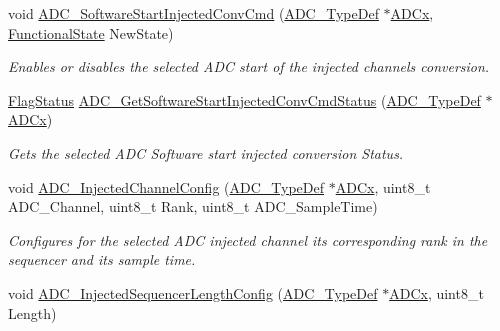 \begin{DoxyCompactItemize}
void \mbox{\hyperlink{group___a_d_c___exported___functions_ga5b141d5dbf5f417a11dfa622c8c149d3}{A\+D\+C\+\_\+\+Software\+Start\+Injected\+Conv\+Cmd}} (\mbox{\hyperlink{struct_a_d_c___type_def}{A\+D\+C\+\_\+\+Type\+Def}} $\ast$\mbox{\hyperlink{group___s_t_m32_f1_x_x___n_u_c_l_e_o___l_o_w___l_e_v_e_l___exported___constants_gab44c1065d38c298955fc028346984340}{A\+D\+Cx}}, \mbox{\hyperlink{group___exported__types_gac9a7e9a35d2513ec15c3b537aaa4fba1}{Functional\+State}} New\+State)
\begin{DoxyCompactList}\small\item\em Enables or disables the selected A\+DC start of the injected channels conversion. \end{DoxyCompactList}\item 
\mbox{\hyperlink{group___exported__types_ga89136caac2e14c55151f527ac02daaff}{Flag\+Status}} \mbox{\hyperlink{group___a_d_c___exported___functions_ga8765f8835b8cfed13dce3d8d71767dcc}{A\+D\+C\+\_\+\+Get\+Software\+Start\+Injected\+Conv\+Cmd\+Status}} (\mbox{\hyperlink{struct_a_d_c___type_def}{A\+D\+C\+\_\+\+Type\+Def}} $\ast$\mbox{\hyperlink{group___s_t_m32_f1_x_x___n_u_c_l_e_o___l_o_w___l_e_v_e_l___exported___constants_gab44c1065d38c298955fc028346984340}{A\+D\+Cx}})
\begin{DoxyCompactList}\small\item\em Gets the selected A\+DC Software start injected conversion Status. \end{DoxyCompactList}\item 
void \mbox{\hyperlink{group___a_d_c___exported___functions_gae2b44bff080184e1cf6f2cb6b9bb3e59}{A\+D\+C\+\_\+\+Injected\+Channel\+Config}} (\mbox{\hyperlink{struct_a_d_c___type_def}{A\+D\+C\+\_\+\+Type\+Def}} $\ast$\mbox{\hyperlink{group___s_t_m32_f1_x_x___n_u_c_l_e_o___l_o_w___l_e_v_e_l___exported___constants_gab44c1065d38c298955fc028346984340}{A\+D\+Cx}}, uint8\+\_\+t A\+D\+C\+\_\+\+Channel, uint8\+\_\+t Rank, uint8\+\_\+t A\+D\+C\+\_\+\+Sample\+Time)
\begin{DoxyCompactList}\small\item\em Configures for the selected A\+DC injected channel its corresponding rank in the sequencer and its sample time. \end{DoxyCompactList}\item 
void \mbox{\hyperlink{group___a_d_c___exported___functions_ga24eba90bc3ee955e07659a605011710d}{A\+D\+C\+\_\+\+Injected\+Sequencer\+Length\+Config}} (\mbox{\hyperlink{struct_a_d_c___type_def}{A\+D\+C\+\_\+\+Type\+Def}} $\ast$\mbox{\hyperlink{group___s_t_m32_f1_x_x___n_u_c_l_e_o___l_o_w___l_e_v_e_l___exported___constants_gab44c1065d38c298955fc028346984340}{A\+D\+Cx}}, uint8\+\_\+t Length)

\end{DoxyCompactItemize}
